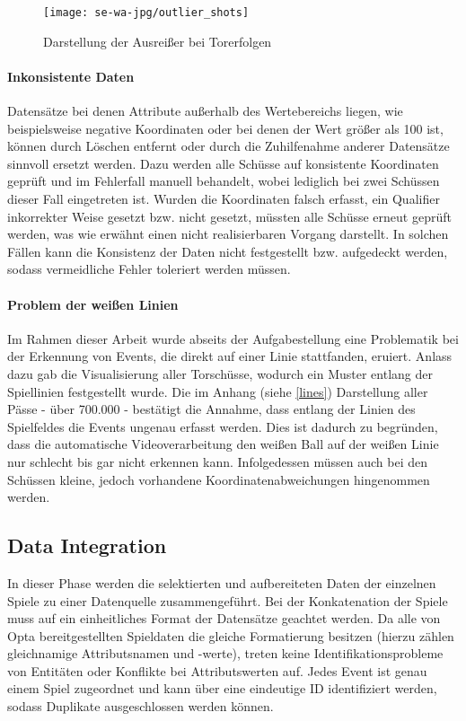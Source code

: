 \begin{sidewaysfigure}[H]
\centering
\texttt{[image: se-wa-jpg/outlier\_shots]}
\caption[Darstellung der Ausreißer bei Torerfolgen]{Darstellung der Ausreißer bei Torerfolgen}
\label{outlier_shots}
\end{sidewaysfigure}

\paragraph{Inkonsistente Daten} 
Datensätze bei denen Attribute außerhalb des Wertebereichs liegen, wie beispielsweise negative Koordinaten oder bei denen der Wert größer als 100 ist, können durch Löschen entfernt oder durch die Zuhilfenahme anderer Datensätze sinnvoll ersetzt werden. Dazu werden alle Schüsse auf konsistente Koordinaten geprüft und im Fehlerfall manuell behandelt, wobei lediglich bei zwei Schüssen dieser Fall eingetreten ist. Wurden die Koordinaten falsch erfasst, ein Qualifier inkorrekter Weise gesetzt bzw. nicht gesetzt, müssten alle Schüsse erneut geprüft werden, was wie erwähnt einen nicht realisierbaren Vorgang darstellt. In solchen Fällen kann die Konsistenz der Daten nicht festgestellt bzw. aufgedeckt werden, sodass vermeidliche Fehler toleriert werden müssen.

\paragraph{Problem der weißen Linien} 
Im Rahmen dieser Arbeit wurde abseits der Aufgabestellung eine Problematik bei der Erkennung von Events, die direkt auf einer Linie stattfanden, eruiert. Anlass dazu gab die Visualisierung aller Torschüsse, wodurch ein Muster entlang der Spiellinien festgestellt wurde. Die im Anhang (siehe \vref{lines}) Darstellung aller Pässe - über 700.000 - bestätigt die Annahme, dass entlang der Linien des Spielfeldes die Events ungenau erfasst werden. Dies ist dadurch zu begründen, dass die automatische Videoverarbeitung den weißen Ball auf der weißen Linie nur schlecht bis gar nicht erkennen kann. Infolgedessen müssen auch bei den Schüssen kleine, jedoch vorhandene Koordinatenabweichungen hingenommen werden.
	
\subsection{Data Integration}
\label{datai}
In dieser Phase werden die selektierten und aufbereiteten Daten der einzelnen Spiele zu einer Datenquelle zusammengeführt. Bei der Konkatenation der Spiele muss auf ein einheitliches Format der Datensätze geachtet werden. Da alle von Opta bereitgestellten Spieldaten die gleiche Formatierung besitzen (hierzu zählen gleichnamige Attributsnamen und -werte), treten keine Identifikationsprobleme von Entitäten oder Konflikte bei Attributswerten auf. Jedes Event ist genau einem Spiel zugeordnet und kann über eine eindeutige ID identifiziert werden, sodass Duplikate ausgeschlossen werden können.
\newpage

